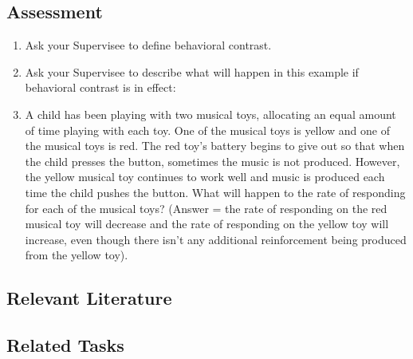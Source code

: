 \subsection{Assessment}
\begin{enumerate}
\item Ask your Supervisee to define behavioral contrast.
\item Ask your Supervisee to describe what will happen in this example if behavioral contrast is in effect: 
\item A child has been playing with two musical toys, allocating an equal amount of time playing with each toy. One of the musical toys is yellow and one of the musical toys is red. The red toy's battery begins to give out so that when the child presses the button, sometimes the music is not produced. However, the yellow musical toy continues to work well and music is produced each time the child pushes the button. What will happen to the rate of responding for each of the musical toys? (Answer = the rate of responding on the red musical toy will decrease and the rate of responding on the yellow toy will increase, even though there isn't any additional reinforcement being produced from the yellow toy).
\end{enumerate}
%
\subsection{Relevant Literature}
\begin{refsection}
\nocite{cooper2007applied,
        fagen1978behavioral,
        hantula1994behavioral,
        mcsweeney1998habituation,
        reynolds1961behavioral,
        reynolds1963some,
        tarbox2005verbal,
        weatherly1996picking,
        weatherly2002rats}
\printbibliography[heading=none]
\end{refsection}
%
\subsection{Related Tasks}
\fourcTwo{}\\
\fourdFifteen{}\\
\fourdSixteen{}\\
\fourdSeventeen{}\\
\fourdNineteen{}\\
\fourjTen{}\\
\fourkTwo{}\\
\fourFKThirtyEight{}\\
\fourFKFourty{}\\
